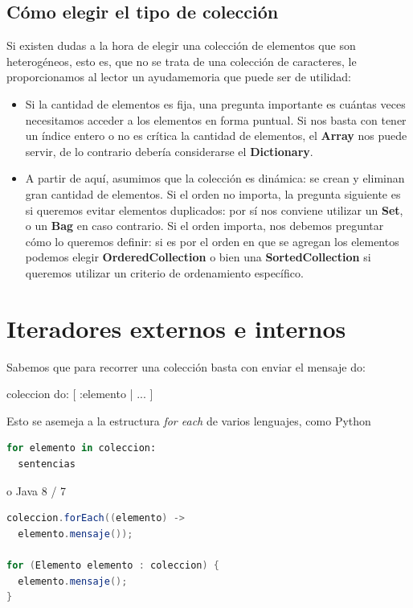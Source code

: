 \documentclass[a4paper,12pt]{book}
\begin{document}
\subsection{Cómo elegir el tipo de colección}

Si existen dudas a la hora de elegir una colección de elementos que son heterogéneos, esto es, que no se trata
de una colección de caracteres, le proporcionamos al lector un ayudamemoria que puede ser de utilidad:

\begin{itemize}
 \item Si la cantidad de elementos es fija, una pregunta importante es cuántas veces necesitamos acceder
 a los elementos en forma puntual. Si nos basta con tener un índice entero o no es crítica la cantidad
 de elementos, el \textbf{Array} nos puede servir, de lo contrario debería considerarse el \textbf{Dictionary}.
 \item A partir de aquí, asumimos que la colección es dinámica: se crean y eliminan gran cantidad de elementos.
 Si el orden no importa, la pregunta siguiente es si queremos evitar elementos duplicados: por sí nos conviene
 utilizar un \textbf{Set}, o un \textbf{Bag} en caso contrario. Si el orden importa, nos debemos preguntar cómo
 lo queremos definir: si es por el orden en que se agregan los elementos podemos elegir \textbf{OrderedCollection}
 o bien una \textbf{SortedCollection} si queremos utilizar un criterio de ordenamiento específico. 
\end{itemize}

\section{Iteradores externos e internos}

Sabemos que para recorrer una colección basta con enviar el mensaje do: 

\begin{code}
coleccion do: [ :elemento | ... ]
\end{code}

Esto se asemeja a la estructura \textit{for each} de varios lenguajes, como Python

\begin{lstlisting}[language=Python]  
for elemento in coleccion:
  sentencias
\end{lstlisting}

o Java 8 / 7
\begin{lstlisting}[language=Java]  
coleccion.forEach((elemento) ->
  elemento.mensaje());
  
for (Elemento elemento : coleccion) {
  elemento.mensaje();
}
\end{lstlisting}
\end{document}

